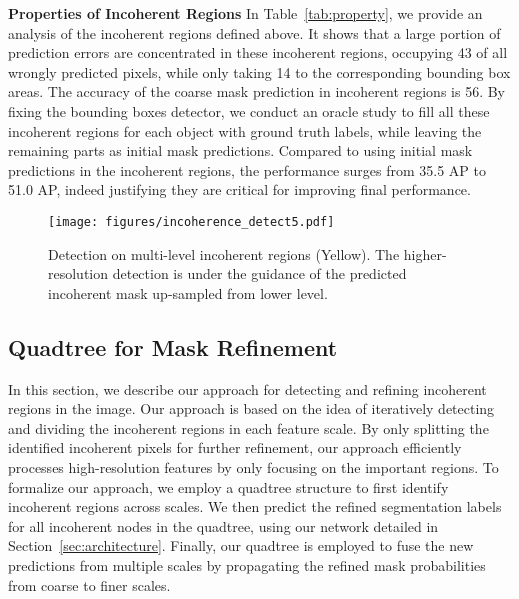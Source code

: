 \documentclass[10pt,twocolumn,letterpaper]{article}
\newcommand{\parsection}[1]{\vspace{1mm}\noindent\textbf{#1}}
\begin{document}
\parsection{Properties of Incoherent Regions}
In Table~\ref{tab:property}, we provide an analysis of the incoherent regions defined above. It shows that a large portion of prediction errors are concentrated in these incoherent regions, occupying 43 of all wrongly predicted pixels, while only taking 14 to the corresponding bounding box areas. The accuracy of the coarse mask prediction in incoherent regions is 56. By fixing the bounding boxes detector, we conduct an oracle study to fill all these incoherent regions for each object with ground truth labels, while leaving the remaining parts as initial mask predictions. Compared to using initial mask predictions in the incoherent regions, the performance surges from 35.5 AP to 51.0 AP, indeed justifying they are critical for improving final performance.


\begin{figure}[!t]
	\centering
\texttt{[image: figures/incoherence\_detect5.pdf]}
	\caption{Detection on multi-level incoherent regions (Yellow). The higher-resolution detection is under the guidance of the predicted incoherent mask up-sampled from lower level.}
\label{fig:incoherent_detect}
	\vspace{-0.2in}
\end{figure}

\subsection{Quadtree for Mask Refinement}
\label{quadtree_refinement}


In this section, we describe our approach for detecting and refining incoherent regions in the image.
Our approach is based on the idea of iteratively detecting and dividing the incoherent regions in each feature scale. By only splitting the identified incoherent pixels for further refinement, our approach efficiently processes high-resolution features by only focusing on the important regions. To formalize our approach, we employ a quadtree structure to first identify incoherent regions across scales. We then predict the refined segmentation labels for all incoherent nodes in the quadtree, using our network detailed in Section~\ref{sec:architecture}. Finally, our quadtree is employed to fuse the new predictions from multiple scales by propagating the refined mask probabilities from coarse to finer scales. 
\end{document}

